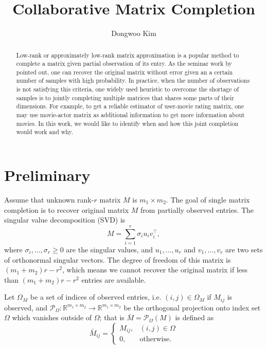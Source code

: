\documentclass{article} %
\title{Collaborative Matrix Completion}
\author{
Dongwoo Kim
}
\newcommand\mc{\mathcal} %
\begin{document}
\maketitle

\begin{abstract}
Low-rank or approximately low-rank matrix approximation is a popular method to complete a matrix given partial observation of its entry. As the seminar work by \cite{candes2009exact} pointed out, one can recover the original matrix without error given an a certain number of samples with high probability. In practice, when the number of observations is not satisfying this criteria, one widely used heuristic to overcome the shortage of samples is to jointly completing multiple matrices that shares some parts of their dimensions. For example, to get a reliable estimator of user-movie rating matrix, one may use movie-actor matrix as additional information to get more information about movies. In this work, we would like to identify when and how this joint completion would work and why.
\end{abstract}

\section{Preliminary}
Assume that unknown rank-$r$ matrix $M$ is $m_1 \times m_2$. The goal of single matrix completion is to recover original matrix $M$ from partially observed entries. The singular value decomposition (SVD) is
\begin{equation}
M = \sum_{i=1}^{r}\sigma_i u_i v_i^\top,
\end{equation}
where $\sigma_i,...,\sigma_r \geq 0$ are the singular values, and $u_1,...,u_r$ and $v_1,...,v_r$ are two sets of orthonormal singular vectors. The degree of freedom of this matrix is $(m_1+m_2)r - r^2$, which means we cannot recover the original matrix if less than $(m_1+m_2)r - r^2$ entries are available.  

Let $\Omega_M$ be a set of indices of observed entries, i.e. $(i,j) \in \Omega_M$ if $M_{ij}$ is observed, and $\mc{P}_{\Omega}: \mathbb{R}^{m_1\times m_2} \rightarrow \mathbb{R}^{m_1\times m_2}$ be the orthogonal projection onto index set $\Omega$ which vanishes outside of $\Omega$; that is $\bar{M} = \mc{P}_{\Omega}(M)$ is defined as
\begin{equation}
\bar{M}_{ij} = \left\{
  \begin{array}{lr}
    M_{ij}, & (i,j) \in \Omega\\
    0, & \text{otherwise}.
  \end{array}
\right.
\end{equation}
\end{document}
